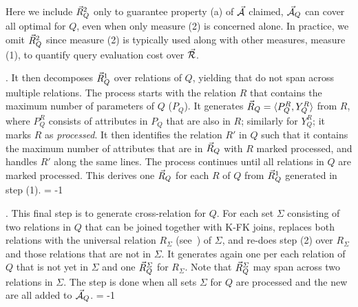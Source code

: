 \vspace{0.36ex}
Here we include $\vec{R}_{Q}^{2}$ only to guarantee property (a)
of $\vec{{\mathcal A}}$ claimed, \ie $\vec{{\mathcal A}}_{Q}$ can cover all optimal
\bdss for $Q$, even when only measure (2) is concerned alone. In
practice, we omit $\vec{R}_{Q}^{2}$ since measure (2) is typically
used along with other measures, \eg measure (1), to quantify
query evaluation cost over $\vec{{\mathcal R}}$.


\vspace{0.36ex}

. It then decomposes $\vec{R}_{Q}^{1}$ over relations of
$Q$, yielding \bss that do not span across multiple relations. The
process starts with the relation $R$ that contains the maximum
number of parameters of $Q$ (\ie $P_{Q}$). It generates
$\vec{R}_{Q} = \langle P_{Q}^{R},\allowbreak Y_{Q}^{R}\rangle$ from $R$, where
$P_{Q}^{R}$ consists of attributes in $P_{Q}$ that are also in
$R$; similarly for $Y_{Q}^{R}$; it marks $R$ as {\em processed}.
It then identifies the relation $R'$ in $Q$ such that
  it contains the maximum
number of attributes that are in \bss $\vec{R}_{Q}$ with $R$
marked processed, and handles $R'$ along the same lines. The
process continues until all relations in $Q$ are marked
processed. This derives one \bs $\vec{R}_{Q}$ for each $R$ of $Q$
from $\vec{R}_{Q}^{1}$ generated in step (1). \looseness = -1

\vspace{0.36ex}

. This final step is to generate cross-relation \bss
for $Q$. For each set $\Sigma$ consisting of two relations in $Q$
that can be joined together with K-FK joins, \usc replaces both
relations with the universal relation $R_{\Sigma}$
(see~\cite{AbHuVi1995}) of $\Sigma$, and re-does step (2) over
$R_{\Sigma}$ and those relations that are not in $\Sigma$. It
generates again one \bs per each relation of $Q$ that is not yet
in $\Sigma$ and one \bs $\vec{R}_{Q}^{\Sigma}$ for $R_{\Sigma}$. Note
that $\vec{R}_{Q}^{\Sigma}$ may span across two relations in $\Sigma$.
The step is done %
when all sets $\Sigma$ for $Q$ are processed
and the new \bss are all added to $\vec{{\mathcal A}}_{Q}$. \looseness = -1



